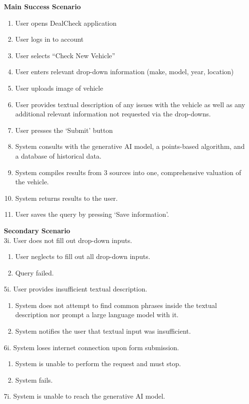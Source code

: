 \documentclass[]{article}
\begin{document}
\begin{enumerate}
\begin{enumerate}[{\bf {BE}1.}]
	{\bf Main Success Scenario}
		\begin{enumerate}[1.]
			\item User opens DealCheck application
			\item User logs in to account
			\item User selects “Check New Vehicle”
			\item User enters relevant drop-down information (make, model, year, location)
			\item User uploads image of vehicle
			\item User provides textual description of any issues with the vehicle as well as any additional relevant information not requested via the drop-downs.
			\item User presses the ‘Submit’ button
			\item System consults with the generative AI model, a points-based algorithm, and a database of historical data.
			\item System compiles results from 3 sources into one, comprehensive valuation of the vehicle.
			\item System returns results to the user.
			\item User saves the query by pressing ‘Save information’.
		\end{enumerate}
		{\bf Secondary Scenario} \\
		3i. User does not fill out drop-down inputs.
		\begin{enumerate}[{3i}.1]
			\item User neglects to fill out all drop-down inputs.
			\item Query failed.
		\end{enumerate}
		5i. User provides insufficient textual description.
		\begin{enumerate}[{5i}.1]
			\item System does not attempt to find common phrases inside the textual description nor prompt a large language model with it.
			\item System notifies the user that textual input was insufficient.
		\end{enumerate}
		6i. System loses internet connection upon form submission.
		\begin{enumerate}[{6i}.1]
			\item System is unable to perform the request and must stop.
			\item System fails.
		\end{enumerate}
		7i. System is unable to reach the generative AI model.

\end{enumerate}
\end{enumerate}
\end{document}
